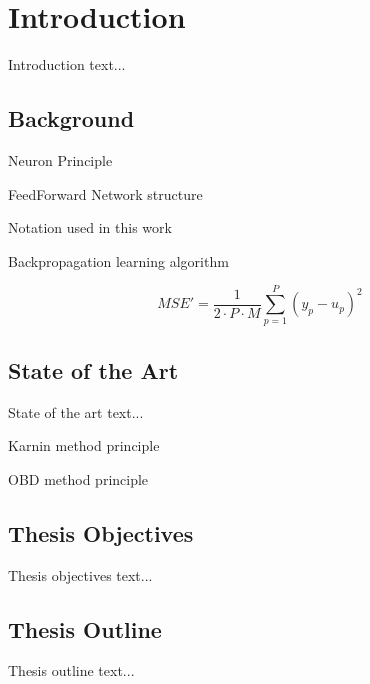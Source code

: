 \chapter{Introduction} \label{chap:introduction}
Introduction text...

\section{Background} \label{sec:background}
Neuron Principle

FeedForward Network structure

Notation used in this work

Backpropagation learning algorithm

\begin{equation} \label{eq:mse_}
MSE' = \frac{1}{2 \cdot P \cdot M} \displaystyle \sum^{P}_{p=1} (y_p - u_p)^2
\end{equation}

\citep{article:perceptron}

\section{State of the Art} \label{sec:state_of_the_art}
State of the art text...  \citep{article:pruning_algorithms}

Karnin method principle

OBD method principle

\section{Thesis Objectives} \label{sec:thesis_objectives}
Thesis objectives text...

\section{Thesis Outline} \label{sec:thesis_outline}
Thesis outline text...